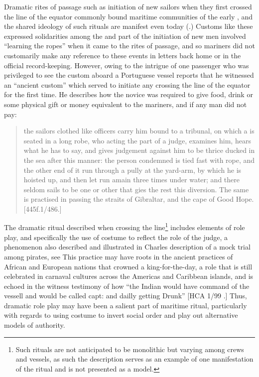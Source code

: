 Dramatic rites of passage such as initiation of new sailors when they first crossed the line of the equator commonly bound maritime communities of the early , and the shared ideology of such rituals are manifest even today (\citealt{Bronner2006}.) Customs like these expressed solidarities among the  and part of the initiation of new men involved “learning the ropes” when it came to the rites of passage, and so mariners did not customarily make any reference to these events in letters back home or in the official record-keeping. However, owing to the intrigue of one passenger who was privileged to see the custom aboard a  Portuguese vessel reports that he witnessed an “ancient custom” which served to initiate any  crossing the line of the equator for the first time. He describes how the novice  was required to give food, drink or some physical gift or money equivalent to the mariners, and if any man did not pay: 

\begin{quotation}
the sailors clothed like officers carry him bound to a tribunal, on which a  is seated in a long robe, who acting the part of a judge, examines him, hears what he has to say, and gives judgement against him to be thrice ducked in the sea after this manner: the person condemned is tied fast with rope, and the other end of it run through a pully at the yard-arm, by which he is hoisted up, and then let run amain three times under water; and there seldom sails to be one or other that gies the rest this diversion. The same is practised in passing the straits of Gibraltar, and the cape of Good Hope. [445f.1/486.] 
\end{quotation}

The dramatic ritual described when crossing the line\footnote{Such rituals are not anticipated to be monolithic but varying among crews and vessels, as such the description serves as an example of one manifestation of the ritual and is not presented as a model.}  includes elements of role play, and specifically the use of costume to reflect the role of the judge, a phenomenon also described and illustrated in Charles  description of a mock trial among pirates, see  This practice may have roots in the ancient practices of African and European nations that crowned a king-for-the-day, a role that is still celebrated in carnaval cultures across the Americas and Caribbean islands, and is echoed in the witness testimony of how “the Indian would have command of the vessell and would be called capt: and dailly getting Drunk” [HCA 1/99 \citealt{Barbados1733}.] Thus, dramatic role play may have been a salient part of maritime ritual, particularly with regards to using costume to invert social order and play out alternative models of authority. 

